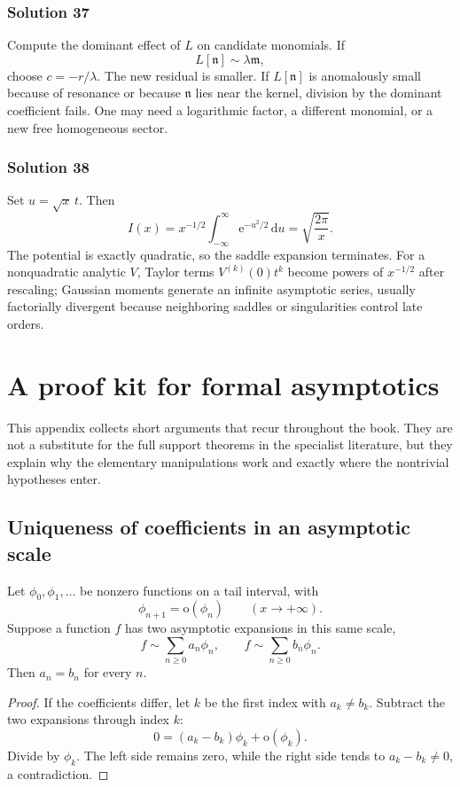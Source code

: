 \documentclass[11pt,openany]{book}
\theoremstyle{plain}
\theoremstyle{definition}
\theoremstyle{remark}
\newcommand{\m}{\mathfrak{m}}
\newcommand{\n}{\mathfrak{n}}
\newcommand{\smallo}{\mathrm{o}}
\newcommand{\dd}{\,\mathrm{d}}
\newcommand{\e}{\mathrm{e}}
\begin{document}
\subsection*{Solution 37}
Compute the dominant effect of $L$ on candidate monomials. If
\[
  L[\n]\sim\lambda\m,
\]
choose $c=-r/\lambda$. The new residual is smaller. If $L[\n]$ is anomalously small because of resonance or because $\n$ lies near the kernel, division by the dominant coefficient fails. One may need a logarithmic factor, a different monomial, or a new free homogeneous sector.

\subsection*{Solution 38}
Set $u=\sqrt{x}\,t$. Then
\[
 I(x)=x^{-1/2}\int_{-\infty}^{\infty}\e^{-u^2/2}\dd u
 =\sqrt{\frac{2\pi}{x}}.
\]
The potential is exactly quadratic, so the saddle expansion terminates. For a nonquadratic analytic $V$, Taylor terms $V^{(k)}(0)t^k$ become powers of $x^{-1/2}$ after rescaling; Gaussian moments generate an infinite asymptotic series, usually factorially divergent because neighboring saddles or singularities control late orders.

\appendix

\chapter{A proof kit for formal asymptotics}
\label{app:proofkit}

This appendix collects short arguments that recur throughout the book.  They are not a substitute for the full support theorems in the specialist literature, but they explain why the elementary manipulations work and exactly where the nontrivial hypotheses enter.

\section{Uniqueness of coefficients in an asymptotic scale}

Let $\phi_0,\phi_1,\ldots$ be nonzero functions on a tail interval, with
\[
 \phi_{n+1}=\smallo(\phi_n)
 \qquad(x\to+\infty).
\]
Suppose a function $f$ has two asymptotic expansions in this same scale,
\[
 f\sim\sum_{n\ge0}a_n\phi_n,
 \qquad
 f\sim\sum_{n\ge0}b_n\phi_n.
\]
Then $a_n=b_n$ for every $n$.

\begin{proof}
If the coefficients differ, let $k$ be the first index with $a_k\ne b_k$. Subtract the two expansions through index $k$:
\[
 0=(a_k-b_k)\phi_k+\smallo(\phi_k).
\]
Divide by $\phi_k$. The left side remains zero, while the right side tends to $a_k-b_k\ne0$, a contradiction.
\end{proof}
\end{document}

